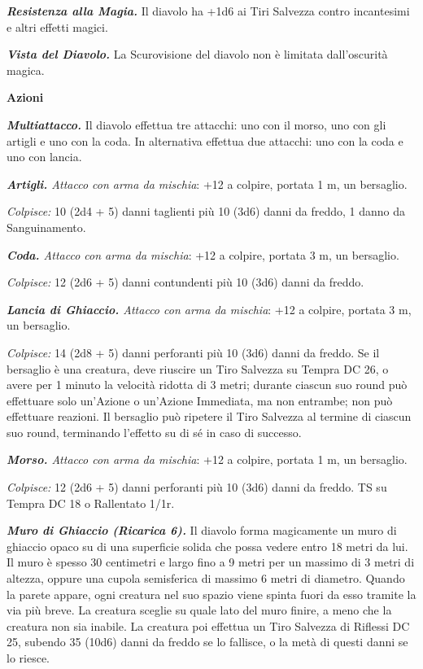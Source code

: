 \begin{multicols}{2}
{\emph{\textbf{Resistenza alla Magia.}} Il diavolo ha +1d6 ai Tiri Salvezza contro incantesimi e altri effetti magici.

\emph{\textbf{Vista del Diavolo.}} La Scurovisione del diavolo non è limitata dall'oscurità magica.

\textbf{Azioni}

\emph{\textbf{Multiattacco.}} Il diavolo effettua tre attacchi: uno con il morso, uno con gli artigli e uno con la coda. In alternativa effettua due attacchi: uno con la coda e uno con lancia.

\emph{\textbf{Artigli.} Attacco con arma da mischia}: +12 a colpire, portata 1 m, un bersaglio.

\emph{Colpisce:} 10 (2d4 + 5) danni taglienti più 10 (3d6) danni da freddo, 1 danno da Sanguinamento.

\emph{\textbf{Coda.} Attacco con arma da mischia}: +12 a colpire, portata 3 m, un bersaglio.

\emph{Colpisce:} 12 (2d6 + 5) danni contundenti più 10 (3d6) danni da freddo.

\emph{\textbf{Lancia di Ghiaccio.} Attacco con arma da mischia}: +12 a colpire, portata 3 m, un bersaglio.

\emph{Colpisce:} 14 (2d8 + 5) danni perforanti più 10 (3d6) danni da freddo. Se il bersaglio è una creatura, deve riuscire un Tiro Salvezza su Tempra DC 26, o avere per 1 minuto la velocità ridotta di 3 metri; durante ciascun suo round può effettuare solo un'Azione o un'Azione Immediata, ma non entrambe; non può effettuare reazioni. Il bersaglio può ripetere il Tiro Salvezza al termine di ciascun suo round, terminando l'effetto su di sé in caso di successo.

\emph{\textbf{Morso.} Attacco con arma da mischia}: +12 a colpire, portata 1 m, un bersaglio.

\emph{Colpisce:} 12 (2d6 + 5) danni perforanti più 10 (3d6) danni da freddo. TS su Tempra DC 18 o Rallentato 1/1r.

\emph{\textbf{Muro di Ghiaccio (Ricarica 6).}} Il diavolo forma magicamente un muro di ghiaccio opaco su di una superficie solida che possa vedere entro 18 metri da lui. Il muro è spesso 30 centimetri e largo fino a 9 metri per un massimo di 3 metri di altezza, oppure una cupola semisferica di massimo 6 metri di diametro. Quando la parete appare, ogni creatura nel suo spazio viene spinta fuori da esso tramite la via più breve. La creatura sceglie su quale lato del muro finire, a meno che la creatura non sia inabile. La creatura poi effettua un Tiro Salvezza di Riflessi DC 25, subendo 35 (10d6) danni da freddo se lo fallisce, o la metà di questi danni se lo riesce.

}
\end{multicols}
